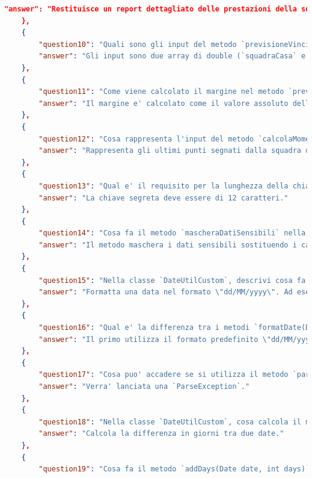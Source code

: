 \documentclass[12pt,a4paper,openright,twoside]{book}
\begin{document}
\begin{lstlisting}[language=json, caption={Domande/Risposte generate da NotebookLM}]
        "answer": "Restituisce un report dettagliato delle prestazioni della squadra."
    },
    {
        "question10": "Quali sono gli input del metodo `previsioneVincitore` nella classe `BasketballStats` e cosa rappresentano?",
        "answer": "Gli input sono due array di double (`squadraCasa` e `squadraOspite`) che contengono `[puntiMedi, rimbalziMedi, assistMedi]`, e una `LocalDate dataPartita`."
    },
    {
        "question11": "Come viene calcolato il margine nel metodo `previsioneVincitore` della classe `BasketballStats`?",
        "answer": "Il margine e' calcolato come il valore assoluto della differenza tra la valutazione della squadra di casa e la valutazione della squadra ospite."
    },
    {
        "question12": "Cosa rappresenta l'input del metodo `calcolaMomentum` nella classe `BasketballStats`?",
        "answer": "Rappresenta gli ultimi punti segnati dalla squadra di casa (`ultimiPuntiCasa`) e dalla squadra ospite (`ultimiPuntiOspite`)."
    },
    {
        "question13": "Qual e' il requisito per la lunghezza della chiave segreta nel metodo `cifraturaVortex` della classe `CifratoreAziendale`?",
        "answer": "La chiave segreta deve essere di 12 caratteri."
    },
    {
        "question14": "Cosa fa il metodo `mascheraDatiSensibili` nella classe `TrasformatoreDati`?",
        "answer": "Il metodo maschera i dati sensibili sostituendo i caratteri originali con caratteri casuali."
    },
    {
        "question15": "Nella classe `DateUtilCustom`, descrivi cosa fa il metodo `formatDate(Date date)` e fornisci un esempio del formato di output.",
        "answer": "Formatta una data nel formato \"dd/MM/yyyy\". Ad esempio, se la data e' il 25 dicembre 2023, l'output sara' \"25/12/2023\"."
    },
    {
        "question16": "Qual e' la differenza tra i metodi `formatDate(Date date)` e `formatDate(Date date, String format)` nella classe `DateUtilCustom`?",
        "answer": "Il primo utilizza il formato predefinito \"dd/MM/yyyy\", mentre il secondo permette di specificare un formato personalizzato."
    },
    {
        "question17": "Cosa puo' accadere se si utilizza il metodo `parseDate` della classe `DateUtilCustom` con una stringa che non corrisponde al formato specificato?",
        "answer": "Verra' lanciata una `ParseException`."
    },
    {
        "question18": "Nella classe `DateUtilCustom`, cosa calcola il metodo `getDifferenceInDays(Date startDate, Date endDate)`?",
        "answer": "Calcola la differenza in giorni tra due date."
    },
    {
        "question19": "Cosa fa il metodo `addDays(Date date, int days)` nella classe `DateUtilCustom`?",

\end{lstlisting}
\end{document}
